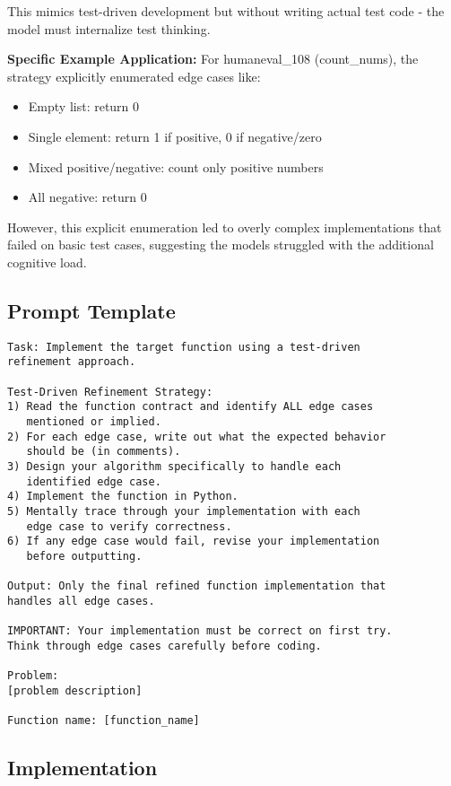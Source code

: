 \documentclass[11pt]{article}
\begin{document}
This mimics test-driven development but without writing actual test code - the model must internalize test thinking.

\textbf{Specific Example Application:} For humaneval\_108 (count\_nums), the strategy explicitly enumerated edge cases like:
\begin{itemize}
    \item Empty list: return 0
    \item Single element: return 1 if positive, 0 if negative/zero
    \item Mixed positive/negative: count only positive numbers
    \item All negative: return 0
\end{itemize}

However, this explicit enumeration led to overly complex implementations that failed on basic test cases, suggesting the models struggled with the additional cognitive load.

\subsection{Prompt Template}

\begin{lstlisting}[caption={Test-Driven Refinement Prompt}]
Task: Implement the target function using a test-driven 
refinement approach.

Test-Driven Refinement Strategy:
1) Read the function contract and identify ALL edge cases 
   mentioned or implied.
2) For each edge case, write out what the expected behavior 
   should be (in comments).
3) Design your algorithm specifically to handle each 
   identified edge case.
4) Implement the function in Python.
5) Mentally trace through your implementation with each 
   edge case to verify correctness.
6) If any edge case would fail, revise your implementation 
   before outputting.

Output: Only the final refined function implementation that 
handles all edge cases.

IMPORTANT: Your implementation must be correct on first try. 
Think through edge cases carefully before coding.

Problem:
[problem description]

Function name: [function_name]
\end{lstlisting}

\subsection{Implementation}
\end{document}
